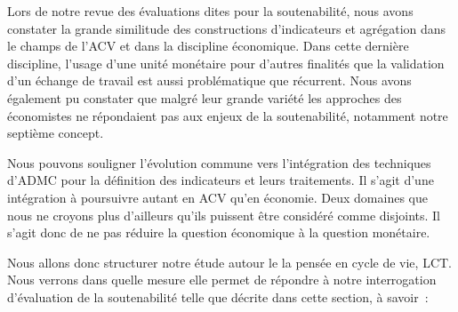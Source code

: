 Lors de notre revue des évaluations dites pour la soutenabilité, nous avons constater la grande similitude des constructions d'indicateurs et agrégation dans le champs de l'\gls{ACV} et dans la discipline économique.
Dans cette dernière discipline, l'usage d'une unité monétaire pour d'autres finalités que la validation d'un échange de travail est aussi problématique que récurrent.
Nous avons également pu constater que malgré leur grande variété les approches des économistes ne répondaient pas aux enjeux de la soutenabilité, notamment notre septième concept.

Nous pouvons souligner l'évolution commune vers l'intégration des techniques d'\gls{ADMC} pour la définition des indicateurs et leurs traitements.
Il s'agit d'une intégration à poursuivre autant en ACV qu'en économie.
Deux domaines que nous ne croyons plus d'ailleurs qu'ils puissent être considéré comme disjoints.
Il s'agit donc de ne pas réduire la question économique à la question monétaire.

Nous allons donc structurer notre étude autour le la pensée en cycle de vie, \gls{LCT}.
Nous verrons dans quelle mesure elle permet de répondre à notre interrogation d'évaluation de la soutenabilité telle que décrite dans cette section, à savoir~:

%
%
%
%

